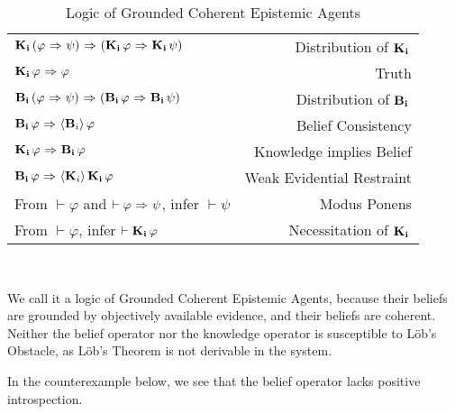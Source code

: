 \begin{table}[H]
	\begin{center}
		\begin{tabular}{| l r |}
			\hline
			$\mathbf{K}_{\mathbf{i}}\,(\varphi {\ \Rightarrow \ } \psi) {\ \Rightarrow \ } (\mathbf{K}_{\mathbf{i}}\,\varphi {\ \Rightarrow \ } \mathbf{K}_{\mathbf{i}}\,\psi)$ & Distribution of $\mathbf{K}_{\mathbf{i}}\,$ \\
			$\mathbf{K}_{\mathbf{i}}\,\varphi {\ \Rightarrow \ } \varphi$ & Truth \\
			$\mathbf{B}_{\mathbf{i}}\,(\varphi {\ \Rightarrow \ } \psi) {\ \Rightarrow \ } (\mathbf{B}_{\mathbf{i}}\,\varphi {\ \Rightarrow \ } \mathbf{B}_{\mathbf{i}}\,\psi)$ & Distribution of $\mathbf{B}_{\mathbf{i}}\,$\\
			$\mathbf{B}_{\mathbf{i}}\,\varphi {\ \Rightarrow \ } \langle \mathbf{B}_{i} \rangle\,\varphi$ & Belief Consistency \\
			$\mathbf{K}_{\mathbf{i}}\,\varphi {\ \Rightarrow \ } \mathbf{B}_{\mathbf{i}}\,\varphi$ & Knowledge implies Belief \\
			$\mathbf{B}_{\mathbf{i}}\,\varphi {\ \Rightarrow \ } \langle \mathbf{K}_{i} \rangle\,\mathbf{K}_{\mathbf{i}}\,\varphi$ & Weak Evidential Restraint\\
			From $\vdash \varphi$ and $\vdash \varphi {\ \Rightarrow \ } \psi$, infer $\vdash\psi$ & Modus Ponens\\
			From $\vdash \varphi$, infer $\vdash \mathbf{K}_{\mathbf{i}}\,\varphi$ & Necessitation of $\mathbf{K}_{\mathbf{i}}\,$\\
			\hline
		\end{tabular}
		\caption{Logic of Grounded Coherent Epistemic Agents}~\label{GC_agent}
	\end{center}
\end{table}

We call it a logic of Grounded Coherent Epistemic Agents, because their beliefs are grounded by objectively available evidence, and their beliefs are coherent. Neither the belief operator nor the knowledge operator is susceptible to L\"ob's Obstacle, as L\"ob's Theorem is not derivable in the system.

In the counterexample below, we see that the belief operator lacks positive introspection.

